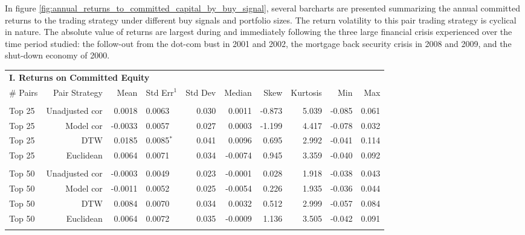 \documentclass[12pt]{article}
\begin{document}
In figure \ref{fig:annual_returns_to_committed_capital_by_buy_signal}, several barcharts are presented summarizing the annual committed returns to the trading strategy under different buy signals and portfolio sizes. The return volatility to this pair trading strategy is cyclical in nature. The absolute value of returns are largest during and immediately following the three large financial crisis experienced over the time period studied: the follow-out from the dot-com bust in 2001 and 2002, the mortgage back security crisis in 2008 and 2009, and the shut-down economy of 2000.

\begin{table}[hp]
    \fontsize{8pt}{8pt}\selectfont
    \centering
    \begin{tabular}{l r r l r r r r r r}
        \multicolumn{9}{l}{\textbf{I. Returns on Committed Equity}} \\
        \# Pairs & Pair Strategy & Mean & Std Err{$^{1}$} & Std Dev & Median & Skew & Kurtosis & Min & Max \\
        \hline
        \vspace{-1mm} \\
        Top 25    & Unadjusted cor &  0.0018 & 0.0063          & 0.030 &  0.0011 & -0.873 & 5.039 & -0.085 & 0.061 \\
        Top 25    & Model cor      & -0.0033 & 0.0057          & 0.027 &  0.0003 & -1.199 & 4.417 & -0.078 & 0.032 \\
        Top 25    & DTW            &  0.0185 & 0.0085{$^{*}$}  & 0.041 &  0.0096 &  0.695 & 2.992 & -0.041 & 0.114 \\
        Top 25    & Euclidean      &  0.0064 & 0.0071          & 0.034 & -0.0074 &  0.945 & 3.359 & -0.040 & 0.092 \\
        \vspace{-1mm} \\
        Top 50    & Unadjusted cor & -0.0003 & 0.0049          & 0.023 & -0.0001 &  0.028 & 1.918 & -0.038 & 0.043 \\
        Top 50    & Model cor      & -0.0011 & 0.0052          & 0.025 & -0.0054 &  0.226 & 1.935 & -0.036 & 0.044 \\
        Top 50    & DTW            &  0.0084 & 0.0070          & 0.034 &  0.0032 &  0.512 & 2.999 & -0.057 & 0.084 \\
        Top 50    & Euclidean      &  0.0064 & 0.0072          & 0.035 & -0.0009 &  1.136 & 3.505 & -0.042 & 0.091 \\
        \vspace{-1mm} \\

\end{tabular}
\end{table}
\end{document}
